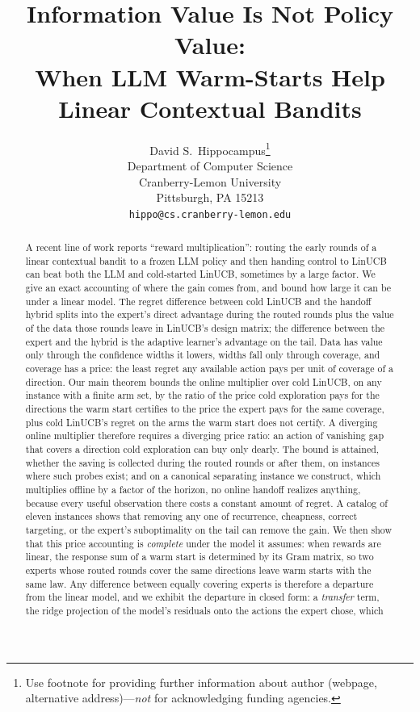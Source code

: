 \documentclass{article}
\title{Information Value Is Not Policy Value:\\ When LLM Warm-Starts Help Linear Contextual Bandits}
\author{%
  David S.~Hippocampus\thanks{Use footnote for providing further information
    about author (webpage, alternative address)---\emph{not} for acknowledging
    funding agencies.} \\
  Department of Computer Science\\
  Cranberry-Lemon University\\
  Pittsburgh, PA 15213 \\
  \texttt{hippo@cs.cranberry-lemon.edu} \\
}
\theoremstyle{definition}
\theoremstyle{remark}
\theoremstyle{remark}
\begin{document}
\maketitle
\begin{abstract}
A recent line of work reports ``reward multiplication'': routing the early
rounds of a linear contextual bandit to a frozen LLM policy and then handing
control to LinUCB can beat both the LLM and cold-started LinUCB, sometimes by a
large factor. We give an exact accounting of where the gain comes from, and bound how
large it can be under a linear model. The regret difference between cold LinUCB and the handoff
hybrid splits into the expert's direct advantage during the routed rounds plus
the value of the data those rounds leave in LinUCB's design matrix; the
difference between the expert and the hybrid is the adaptive learner's
advantage on the tail. Data has value only through the confidence widths it
lowers, widths fall only through coverage, and coverage has a price: the least
regret any available action pays per unit of coverage of a direction. Our
main theorem bounds the online multiplier over cold LinUCB, on any instance
with a finite arm set, by the ratio of the price cold exploration pays for the
directions the warm start certifies to the price the expert pays for the same
coverage, plus cold LinUCB's regret on the arms the warm start does not
certify. A diverging online multiplier therefore requires a diverging price
ratio: an action of vanishing gap that covers a direction cold exploration can
buy only dearly. The bound is attained, whether the saving is collected during
the routed rounds or after them, on instances where such probes exist; and on
a canonical separating instance we construct, which multiplies offline by a
factor of the horizon, no online
handoff realizes anything, because every useful observation there costs a
constant amount of regret. A catalog of eleven instances shows that removing
any one of recurrence, cheapness, correct targeting, or the expert's
suboptimality on the tail can remove the gain.
We then show that this price accounting is \emph{complete} under the
model it assumes: when rewards are linear, the response sum of a warm start
is determined by its Gram matrix, so two experts whose routed rounds cover the
same directions leave warm starts with the same law. Any difference between
equally covering experts is therefore a departure from the linear model, and
we exhibit the departure in closed form: a \emph{transfer} term, the ridge
projection of the model's residuals onto the actions the expert chose, which

\end{abstract}
\end{document}
